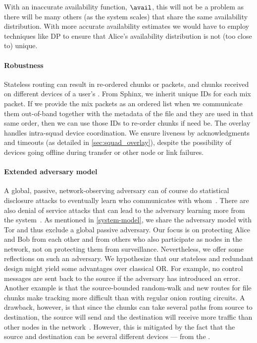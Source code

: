 With an inaccurate availability function, \(\avail\), this will not be a 
problem as there will be many others (as the system scales) that share the 
same availability distribution.
With more accurate availability estimates we would have to employ techniques 
like \ac{DP} to ensure that Alice's availability distribution is not
(too close to)
unique.

\paragraph*{Robustness}

Stateless routing can result in re-ordered chunks or packets, and
chunks received on different devices of a user's \squad. From \ac{Sphinx},
we inherit unique IDs for each mix packet.
If we provide the mix packets as an ordered list when we communicate them 
out-of-band together with the metadata of the file and they are used in that 
same order, then we can use those IDs to re-order chunks if need be.
The \squad overlay handles intra-squad device 
coordination.
We ensure liveness by acknowledgments and timeouts (as detailed in 
\cref{sec:squad_overlay}), despite the possibility of \squad devices
going offline during transfer or other node or link failures.


\paragraph*{Extended adversary model}%
\label{security-limitations}

A global, passive, network-observing adversary can of course do
statistical disclosure attacks to eventually learn who communicates
with whom~\cite{StatisticalDisclosureAttacks}. There are also denial
of service attacks that can lead to the adversary learning more from
the system~\cite{DenialOfSecurity}.  As mentioned in
\cref{system-model}, we share the adversary model with \ac{Tor}
and thus exclude a global passive adversary. Our focus is on
protecting Alice and Bob from each other and from others who also
participate as nodes in the network, not on protecting them from
surveillance. Nevertheless, we offer some reflections on such an
adversary. We hypothesize that our stateless and redundant design
might yield some advantages over classical \ac{OR}. For
example, no control messages are sent back to the source if the
adversary has introduced an error.     Another example is that the source-bounded
random-walk and new routes for file chunks make tracking more
difficult than with regular onion routing circuits. A drawback, however, is
that since the chunks can take several paths from source to destination, the source 
will send and the destination will receive more traffic than other nodes in the 
network~\cite{RoutingSurveyAnonymousProtocols}. However, this is mitigated by the fact that the source and 
destination can be several different devices --- \ie from the \squads.


